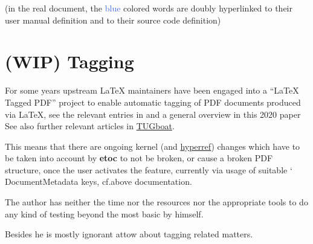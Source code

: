 \documentclass{article}
\DeclareRobustCommand\csa [1]
                {{\ttfamily\hyphenchar\font45 \char`\\ #1}}
\newcommand\etoc{%
        \texorpdfstring{{\color{joli}\ttfamily\bfseries etoc}}{etoc}\xspace}
\DeclareRobustCommand\ctanpkg[1]
      {\texorpdfstring{\href{https://ctan.org/pkg/#1}{#1}}{#1}}
\begin{document}
(in the real document, the \textcolor{RoyalBlue}{blue} colored words are
doubly hyperlinked to their user manual definition and to their source code definition)

\onehalfspacing

\section{(WIP) Tagging}
\label{etoctaggingon}
\label{etoctaggingoff}
\label{etoctagginginlineoff}
\label{etoctagstartTOCcontents}
\label{etocthetocitembegintag}
\label{etoctagReference}
\label{etoctagLbl}
\label{etocthetocitemendtag}
\label{etoctagfinishTOCcontents}

For some years upstream \LaTeX{} maintainers have been engaged into a
``\LaTeX{} Tagged PDF'' project to enable automatic tagging of PDF documents
produced via \LaTeX, see the relevant entries in
and a general overview in this 2020 paper
See also further relevant articles in \href{https://tug.org/tugboat}{TUGboat}.

This means that there are ongoing kernel (and \ctanpkg{hyperref}) changes
which have to be taken into account by \etoc to not be broken, or cause a
broken PDF structure, once the user activates the feature, currently via usage
of suitable \csa{DocumentMetadata} keys, cf.\@ above documentation.

\begingroup{}
\begin{shaded}
The author has neither the time nor the resources nor the appropriate tools to
do any kind of testing beyond the most basic by himself.

Besides he is mostly ignorant attow about tagging related matters.
\end{shaded}
\endgroup
\end{document}
